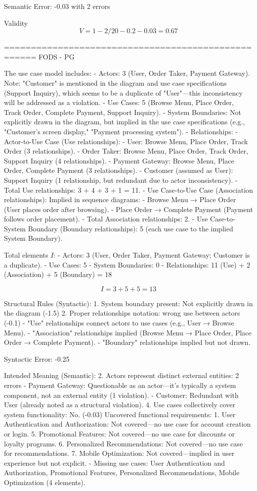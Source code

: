 Semantic Error: -0.03 with 2 errors

Validity
\[
V = 1 - 2/20 - 0.2 - 0.03 = 0.67
\]

====================================================
FODS - PG

The use case model includes:
- Actors: 3 (User, Order Taker, Payment Gateway). Note: "Customer" is mentioned in the diagram and use case specifications (Support Inquiry), which seems to be a duplicate of "User"—this inconsistency will be addressed as a violation.
- Use Cases: 5 (Browse Menu, Place Order, Track Order, Complete Payment, Support Inquiry).
- System Boundaries: Not explicitly drawn in the diagram, but implied in the use case specifications (e.g., "Customer's screen display," "Payment processing system"). 
- Relationships:
- Actor-to-Use Case (Use relationships):
- User: Browse Menu, Place Order, Track Order (3 relationships).
- Order Taker: Browse Menu, Place Order, Track Order, Support Inquiry (4 relationships).
- Payment Gateway: Browse Menu, Place Order, Complete Payment (3 relationships).
- Customer (assumed as User): Support Inquiry (1 relationship, but redundant due to actor inconsistency).
- Total Use relationships: 3 + 4 + 3 + 1 = 11.
- Use Case-to-Use Case (Association relationships): Implied in sequence diagrams:
- Browse Menu → Place Order (User places order after browsing).
- Place Order → Complete Payment (Payment follows order placement).
- Total Association relationships: 2.
- Use Case-to-System Boundary (Boundary relationships): 5 (each use case to the implied System Boundary).

Total elements \( I \):
- Actors: 3 (User, Order Taker, Payment Gateway; Customer is a duplicate).
- Use Cases: 5
- System Boundaries: 0
- Relationships: 11 (Use) + 2 (Association) + 5 (Boundary) = 18

\[
I = 3 + 5 + 5 = 13
\]

Structural Rules (Syntactic):
1. System boundary present: Not explicitly drawn in the diagram (-1.5)
2. Proper relationships notation: wrong use between actors (-0.1)
- "Use" relationships connect actors to use cases (e.g., User → Browse Menu).
- "Association" relationships implied (Browse Menu → Place Order, Place Order → Complete Payment).
- "Boundary" relationships implied but not drawn.

Syntactic Error:  -0.25

Intended Meaning (Semantic):
2. Actors represent distinct external entities: 2 errors
- Payment Gateway: Questionable as an actor—it’s typically a system component, not an external entity (1 violation).
- Customer: Redundant with User (already noted as a structural violation).
4. Use cases collectively cover system functionality: No. (-0.03)
Uncovered functional requirements:
1. User Authentication and Authorization: Not covered—no use case for account creation or login.
5. Promotional Features: Not covered—no use case for discounts or loyalty programs.
6. Personalized Recommendations: Not covered—no use case for recommendations.
7. Mobile Optimization: Not covered—implied in user experience but not explicit.
- Missing use cases: User Authentication and Authorization, Promotional Features, Personalized Recommendations, Mobile Optimization (4 elements).

